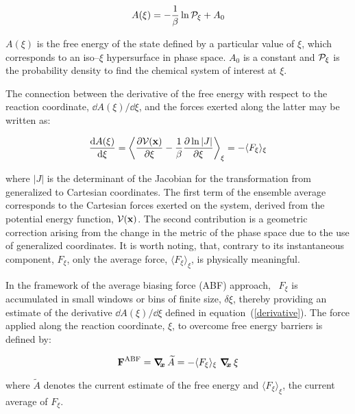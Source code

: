 \begin{equation}
\label{free}
A(\xi) = -\frac{1}{\beta} \ln {\mathcal P}_\xi + A_0
\end{equation}


$A(\xi)$ is the free energy of the state
defined by a particular value of $\xi$, which
corresponds to an iso--$\xi$ hypersurface in
phase space. $A_0$ is a constant and ${\mathcal P}_\xi$
is the probability density to find the
chemical system of interest at $\xi$.


The connection between
the derivative of the free energy with respect to
the reaction coordinate, $\dd A(\xi) / \dd\xi$,
and the forces exerted along the latter
may be written as:~\cite{spri_98_1, deno_00_1}


\begin{equation}
\label{derivative}
\frac{{\rm d} A(\xi)}{{\rm d}\xi} = \left\langle \frac{\partial{\mathcal V}({\bf x})}{\partial\xi}
                     - \frac{1}{\beta}
                       \frac{\partial \ln |J|}{\partial\xi} \right\rangle_\xi
                     = -\langle F_\xi \rangle_\xi
\end{equation}


where $|J|$ is the determinant of the Jacobian for the
transformation from generalized to Cartesian coordinates. The
first term of the ensemble average corresponds to the Cartesian
forces exerted on the system, derived from the potential energy
function, ${\mathcal V}({\bf x})$. The second contribution is a geometric
correction arising from the change in the metric of the phase
space due to the use of generalized coordinates.
It is worth noting, that, contrary to its instantaneous
component, $F_\xi$, only the average force,
$\langle F_\xi \rangle_\xi$, is physically meaningful.


In the framework of the average biasing force (ABF)
approach,~\cite{darv_01_1, rodr_04_1}
$F_\xi$ is accumulated in small windows
or bins of finite size, $\delta \xi$,
thereby providing an estimate of the derivative
$\dd A(\xi) / \dd\xi$ defined in equation~({\ref{derivative}}).
The force applied along the reaction coordinate,
$\xi$, to overcome free energy barriers is defined
by:


\begin{equation}
\label{abf}
{\bf F}^{\rm ABF} = \mbox{\boldmath$\nabla_{\!\!x}\,$} \widetilde A
                  = - \langle F_\xi \rangle_\xi \ \mbox{\boldmath$\nabla_{\!\!x}\,$} \xi
\end{equation}


where $\widetilde A$ denotes the current estimate of the
free energy and $\langle F_\xi \rangle_\xi$, the current
average of $F_\xi$.


